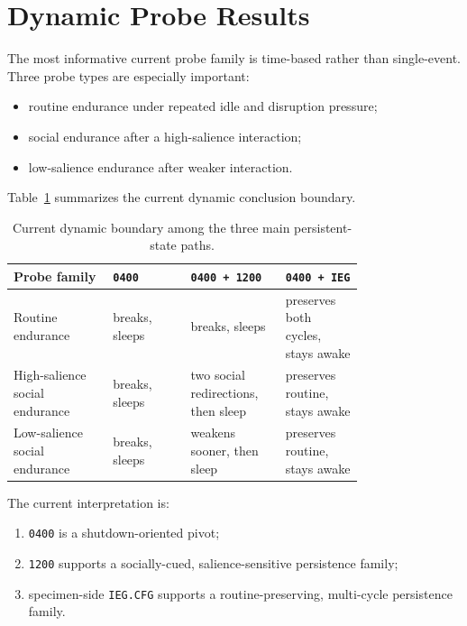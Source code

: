 \documentclass[11pt]{article}
\begin{document}
\section{Dynamic Probe Results}
The most informative current probe family is time-based rather than
single-event. Three probe types are especially important:
\begin{itemize}[leftmargin=*]
\item routine endurance under repeated idle and disruption pressure;
\item social endurance after a high-salience interaction;
\item low-salience endurance after weaker interaction.
\end{itemize}

Table~\ref{tab:dynamic} summarizes the current dynamic conclusion boundary.

\begin{table}[ht]
\centering
\begin{tabular}{>{\raggedright\arraybackslash}p{0.23\linewidth} >{\raggedright\arraybackslash}p{0.18\linewidth} >{\raggedright\arraybackslash}p{0.18\linewidth} >{\raggedright\arraybackslash}p{0.18\linewidth}}
\toprule
Probe family & \texttt{0400} & \texttt{0400 + 1200} & \texttt{0400 + IEG} \\
\midrule
Routine endurance & breaks, sleeps & breaks, sleeps & preserves both cycles, stays awake \\
High-salience social endurance & breaks, sleeps & two social redirections, then sleep & preserves routine, stays awake \\
Low-salience social endurance & breaks, sleeps & weakens sooner, then sleep & preserves routine, stays awake \\
\bottomrule
\end{tabular}
\caption{Current dynamic boundary among the three main persistent-state paths.}
\label{tab:dynamic}
\end{table}

The current interpretation is:
\begin{enumerate}[leftmargin=*]
\item \texttt{0400} is a shutdown-oriented pivot;
\item \texttt{1200} supports a socially-cued, salience-sensitive persistence
family;
\item specimen-side \texttt{IEG.CFG} supports a routine-preserving,
multi-cycle persistence family.
\end{enumerate}
\end{document}
